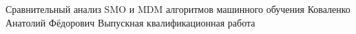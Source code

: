 \SPBGTitleSlide
  {Сравнительный анализ SMO и MDM алгоритмов машинного обучения}
  {Коваленко Анатолий Фёдорович}
  {Выпускная квалификационная работа}
